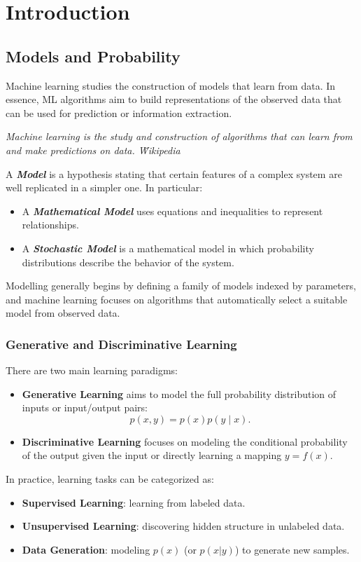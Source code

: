 


\chapter{Introduction}

\section{Models and Probability}
Machine learning studies the construction of models that learn from data. In essence, ML algorithms aim to build representations of the observed data that can be used for prediction or information extraction.

\begin{definitionblock}
    \textit{Machine learning is the study and construction of algorithms that can learn from and make predictions on data. \hfill \~ Wikipedia}
\end{definitionblock}

A \textbf{\textit{Model}} is a hypothesis stating that certain features of a complex system are well replicated in a simpler one. In particular:
\begin{itemize}
    \item A \textbf{\textit{Mathematical Model}} uses equations and inequalities to represent relationships.
    \item A \textbf{\textit{Stochastic Model}} is a mathematical model in which probability distributions describe the behavior of the system.
\end{itemize}
Modelling generally begins by defining a family of models indexed by parameters, and machine learning focuses on algorithms that automatically select a suitable model from observed data.

\subsection{Generative and Discriminative Learning}
There are two main learning paradigms:
\begin{itemize}
    \item \textbf{Generative Learning} aims to model the full probability distribution of inputs or input/output pairs:
    $$
    p(x,y)=p(x)p(y\mid x).
    $$
    \item \textbf{Discriminative Learning} focuses on modeling the conditional probability of the output given the input or directly learning a mapping $y=f(x)$.
\end{itemize}
In practice, learning tasks can be categorized as:
\begin{itemize}
    \item \textbf{Supervised Learning}: learning from labeled data.
    \item \textbf{Unsupervised Learning}: discovering hidden structure in unlabeled data.
    \item \textbf{Data Generation}: modeling $p(x)$ (or $p(x|y)$) to generate new samples.
\end{itemize}


